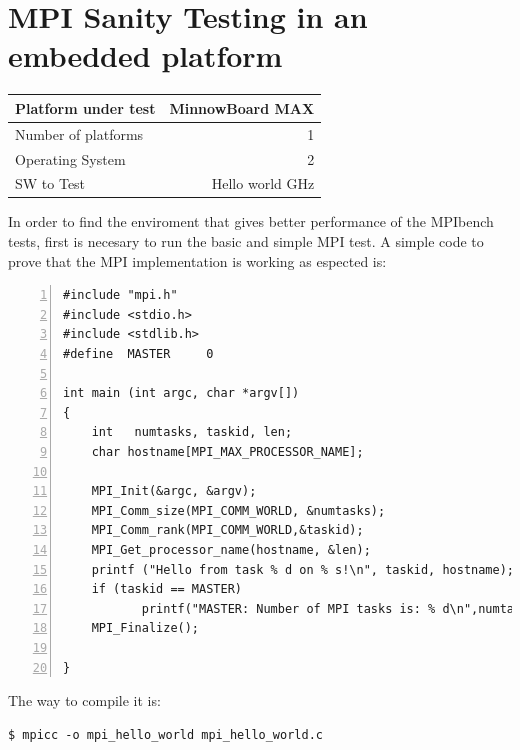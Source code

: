 \section{MPI Sanity Testing in an embedded platform}


    \begin{center}
    \begin{tabular}{ | l | r |}
        \hline
        Platform under test &  MinnowBoard MAX \\ \hline
        Number of platforms  & 1  \\ \hline
        Operating System & 2  \\ \hline
        SW to Test & Hello world GHz  \\ \hline
    \end{tabular}
    \end{center}


In order to find the enviroment that gives better performance of the MPIbench
tests, first is necesary to run the basic and simple MPI test. A simple code to
prove that the MPI implementation is working as espected is:

\begin{minipage}{\textwidth}
\end{minipage}

\begin{minipage}{\textwidth}
\begin{lstlisting}[frame=single,numbers=left,breaklines=true]
#include "mpi.h"
#include <stdio.h>
#include <stdlib.h>
#define  MASTER     0

int main (int argc, char *argv[])
{
    int   numtasks, taskid, len;
    char hostname[MPI_MAX_PROCESSOR_NAME];

    MPI_Init(&argc, &argv);
    MPI_Comm_size(MPI_COMM_WORLD, &numtasks);
    MPI_Comm_rank(MPI_COMM_WORLD,&taskid);
    MPI_Get_processor_name(hostname, &len);
    printf ("Hello from task % d on % s!\n", taskid, hostname);
    if (taskid == MASTER)
           printf("MASTER: Number of MPI tasks is: % d\n",numtasks);
    MPI_Finalize();

}
\end{lstlisting}
\end{minipage}

The way to compile it is: 

\begin{minipage}{\textwidth}
\end{minipage}

\begin{minipage}{\textwidth}
\begin{lstlisting}[frame=single]
  $ mpicc -o mpi_hello_world mpi_hello_world.c
\end{lstlisting}
\end{minipage}

